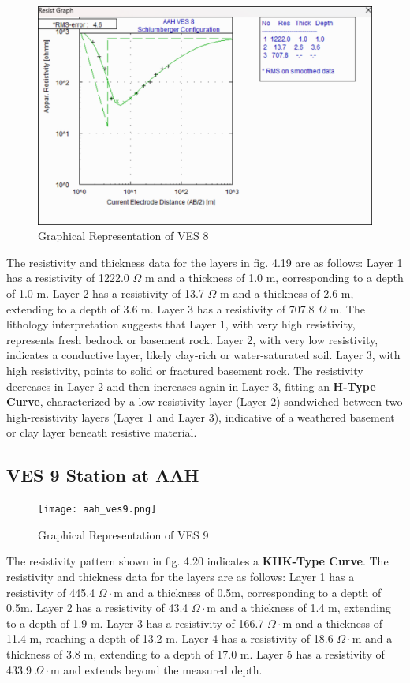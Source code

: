 \documentclass[12pt,a4paper]{report}
\begin{document}
\begin{figure}[H]
    \centering
    \includegraphics[width=1.0\textwidth]{aah_ves8.png}
    \caption{Graphical Representation of VES 8}
    \label{fig:AAH_VES_8_Curve}
\end{figure}
The resistivity and thickness data for the layers in fig. 4.19 are as follows: Layer 1 has a resistivity of 1222.0 $\Omega$ m and a thickness of 1.0 m, corresponding to a depth of 1.0 m. Layer 2 has a resistivity of 13.7 $\Omega$ m and a thickness of 2.6 m, extending to a depth of 3.6 m. Layer 3 has a resistivity of 707.8 $\Omega$ m. The lithology interpretation suggests that Layer 1, with very high resistivity, represents fresh bedrock or basement rock. Layer 2, with very low resistivity, indicates a conductive layer, likely clay-rich or water-saturated soil. Layer 3, with high resistivity, points to solid or fractured basement rock. The resistivity decreases in Layer 2 and then increases again in Layer 3, fitting an \textbf{H-Type Curve}, characterized by a low-resistivity layer (Layer 2) sandwiched between two high-resistivity layers (Layer 1 and Layer 3), indicative of a weathered basement or clay layer beneath resistive material.

\subsection{VES 9 Station at AAH}

\begin{figure}[H]
    \centering
    \texttt{[image: aah\_ves9.png]}
    \caption{Graphical Representation of VES 9}
    \label{fig:AAH_VES_9_Curve}
\end{figure}
The resistivity pattern shown in fig. 4.20 indicates a \textbf{KHK-Type Curve}. The resistivity and thickness data for the layers are as follows: Layer 1 has a resistivity of 445.4 $\Omega\cdot$m and a thickness of 0.5m, corresponding to a depth of 0.5m.  
Layer 2 has a resistivity of 43.4 $\Omega\cdot$m and a thickness of 1.4 m, extending to a depth of 1.9 m.  
Layer 3 has a resistivity of 166.7 $\Omega\cdot$m and a thickness of 11.4 m, reaching a depth of 13.2 m.  
Layer 4 has a resistivity of 18.6 $\Omega\cdot$m and a thickness of 3.8 m, extending to a depth of 17.0 m.  
Layer 5 has a resistivity of 433.9 $\Omega\cdot$m and extends beyond the measured depth.  
\end{document}

